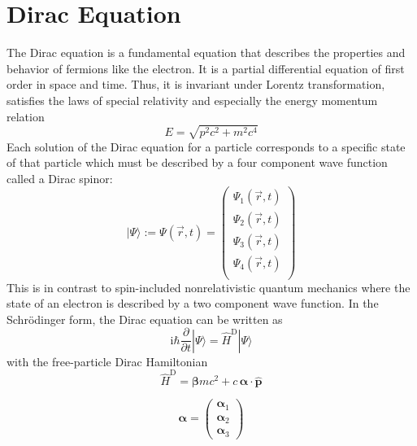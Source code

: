 \documentclass[9pt]{report}
\begin{document}
\newpage
\section{Dirac Equation}
The Dirac equation is a fundamental equation that describes the properties and behavior of fermions like the electron. It is a partial differential equation of first order in space and time. Thus, it is invariant under Lorentz transformation, satisfies the laws of special relativity and especially the energy momentum relation
\begin{equation}
E = \sqrt{p^2c^2+m^2c^4}
\end{equation}
Each solution of the Dirac equation for a particle corresponds to a specific state of that particle which must be described by a four component wave function called a Dirac spinor:
\begin{equation}
|\Psi\rangle := \Psi(\vec{r},t) = 
\left(\begin{array}{c} \Psi_1(\vec{r},t)  \\  \Psi_2(\vec{r},t)  \\  \Psi_3(\vec{r},t)  \\  \Psi_4(\vec{r},t)   \\\end{array}\right)
\end{equation}
This is in contrast to spin-included nonrelativistic quantum mechanics where the state of an electron is described by a two component wave function. In the Schrödinger form, the Dirac equation can be written as
\begin{equation}
\mathrm{i}\hbar\frac{\partial}{\partial t}|\Psi\rangle = \hat{H}^{\mathrm{D}}|\Psi\rangle 
\end{equation}
with the free-particle Dirac Hamiltonian
\begin{equation}
\hat{H}^{\mathrm{D}}=\boldsymbol{\beta}mc^2 +c\,\boldsymbol{\alpha}\cdot\hat{\boldsymbol{p}}
\end{equation}

\begin{equation}
\boldsymbol{\alpha}=
\left(\begin{array}{c}  
\boldsymbol{\alpha}_1
\\
\boldsymbol{\alpha}_2
\\
\boldsymbol{\alpha}_3
\end{array}\right)
\end{equation}
\end{document}
